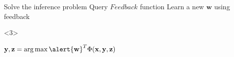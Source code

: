 \begin{frame}
\begin{columns}
\begin{column}{0.5\textwidth}
\begin{block}{}
\begin{algorithmic}
    \REPEAT
    \STATE
    \alert<3>{Solve the inference problem}
    \STATE 
    \alert<4>{Query $\mathit{Feedback}$ function}
    \ENDFOR
    \STATE \alert<1,5>{Learn a new $\mathbf{w}$ using feedback}
  \end{algorithmic}
\end{block}
\begin{block}{}<3>
  \begin{center}
    $\mathbf{y}, \mathbf{z} = \operatorname*{arg\,max} \alert{\mathbf{w}}^T \Phi(\mathbf{x},\mathbf{y},\mathbf{z})$
  \end{center}
\end{block}

\end{column}
\end{columns}
 
\end{frame}



